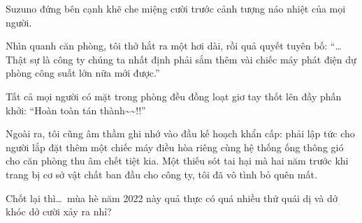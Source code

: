 \documentclass[../main.tex]{subfiles}
\begin{document}
Suzuno đứng bên cạnh khẽ che miệng cười trước cảnh tượng náo nhiệt của mọi người.

Nhìn quanh căn phòng, tôi thở hắt ra một hơi dài, rồi quả quyết tuyên bố: ``\dots Thật sự là công ty chúng ta nhất định phải sắm thêm vài chiếc máy phát điện dự phòng công suất lớn nữa mới được.''

Tất cả mọi người có mặt trong phòng đều đồng loạt giơ tay thốt lên đầy phấn khởi: ``Hoàn toàn tán thành\~{}\~{}!!''


Ngoài ra, tôi cũng âm thầm ghi nhớ vào đầu kế hoạch khẩn cấp: phải lập tức cho người lắp đặt thêm một chiếc máy điều hòa riêng cùng hệ thống ống thông gió cho căn phòng thu âm chết tiệt kia. Một thiếu sót tai hại mà hai năm trước khi trang bị cơ sở vật chất ban đầu cho công ty, tôi đã vô tình bỏ quên mất.

Chốt lại thì\dots\ mùa hè năm 2022 này quả thực có quá nhiều thứ quái dị và dở khóc dở cười xảy ra nhỉ?
\end{document}
